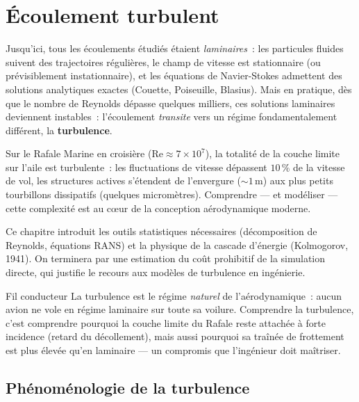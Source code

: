 \documentclass[11pt,a4paper]{report}
\begin{document}
\chapter{\'Ecoulement turbulent}

Jusqu'ici, tous les \'ecoulements \'etudi\'es \'etaient \emph{laminaires}~: les particules
fluides suivent des trajectoires r\'eguli\`eres, le champ de vitesse est stationnaire (ou
pr\'evisiblement instationnaire), et les \'equations de Navier-Stokes admettent des
solutions analytiques exactes (Couette, Poiseuille, Blasius). Mais en pratique, d\`es que
le nombre de Reynolds d\'epasse quelques milliers, ces solutions laminaires deviennent
instables~: l'\'ecoulement \emph{transite} vers un r\'egime fondamentalement diff\'erent,
la \textbf{turbulence}.

Sur le Rafale Marine en croisi\`ere ($\mathrm{Re} \approx 7\times10^7$), la totalit\'e de
la couche limite sur l'aile est turbulente~: les fluctuations de vitesse d\'epassent
$10\,\%$ de la vitesse de vol, les structures actives s'\'etendent de l'envergure
($\sim 1\,\mathrm{m}$) aux plus petits tourbillons dissipatifs (quelques microm\`etres).
Comprendre --- et mod\'eliser --- cette complexit\'e est au c\oe ur de la conception
a\'erodynamique moderne.

Ce chapitre introduit les outils statistiques n\'ecessaires (d\'ecomposition de Reynolds,
\'equations RANS) et la physique de la cascade d'\'energie (Kolmogorov, 1941). On terminera
par une estimation du co\^ut prohibitif de la simulation directe, qui justifie le recours
aux mod\`eles de turbulence en ing\'enierie.

\begin{defbox}{Fil conducteur}
La turbulence est le r\'egime \emph{naturel} de l'a\'erodynamique~: aucun avion ne vole
en r\'egime laminaire sur toute sa voilure. Comprendre la turbulence, c'est comprendre
pourquoi la couche limite du Rafale reste attach\'ee \`a forte incidence (retard du
d\'ecollement), mais aussi pourquoi sa tra\^in\'ee de frottement est plus \'elev\'ee qu'en
laminaire --- un compromis que l'ing\'enieur doit ma\^itriser.
\end{defbox}

\section{Ph\'enom\'enologie de la turbulence}
\end{document}
